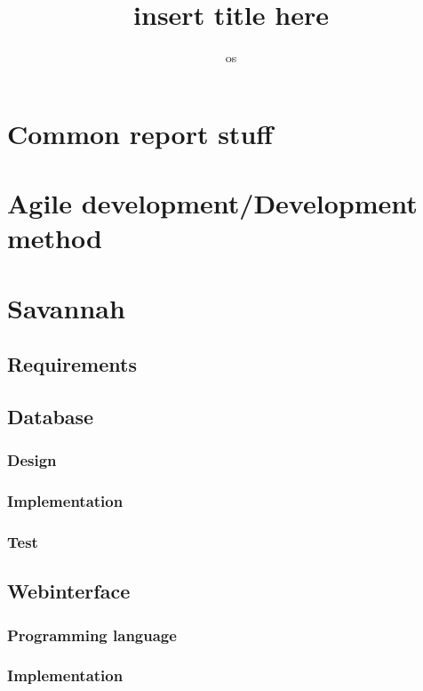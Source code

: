

\title{insert title here} %
\author{os} %


\maketitle
\tableofcontents




\chapter{Common report stuff} %
\chapter{Agile development/Development method} %
\chapter{Savannah} %
  \section{Requirements}
  \section{Database}
    \subsection{Design}
    \subsection{Implementation}
    \subsection{Test}

  \section{Webinterface}
     \subsection{Programming language}
      
     \subsection{Implementation}
